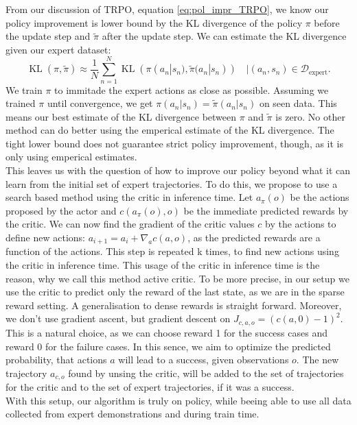 From our discussion of TRPO, equation \ref{eq:pol_impr_TRPO}, we know our policy improvement is lower bound by the KL divergence of the policy $\pi$ before the update step and 
$\tilde{\pi}$ after the update step. We can estimate the KL divergence given our expert dataset:
\begin{equation*}  
    {\operatorname{KL}} (\pi,\tilde{\pi}) \approx \frac{1}{N} \sum_{n=1}^N {\operatorname{KL}} (\pi(a_n|s_n),\tilde{\pi}(a_n|s_n)) \quad |(a_n,s_n) \in \mathcal{D}_{\text{expert}}.
\end{equation*}  
We train $\pi$ to immitade the expert actions as close as possible. Assuming we trained $\pi$ until convergence, we get $\pi(a_n|s_n) = \tilde{\pi}(a_n|s_n)$ on seen 
data. This means our best estimate of the KL divergence between $\pi$ and $\tilde{\pi}$ is zero. No other method can do better using the emperical 
estimate of the KL divergence. The tight lower bound does not guarantee strict policy improvement, though, as it is only using emperical estimates.
\\
This leaves us with the question of how to improve our policy beyond what it can learn from the initial set of expert trajectories. To do this, we propose to use 
a search based method using the critic in inference time. Let $a_{\pi}(o)$ be the actions proposed by the actor and $c(a_{\pi}(o), o)$ be the immediate predicted rewards by the critic. 
We can now find the gradient of the critic values $c$ by the actions to define new actions: $a_{i+1} = a_i + \nabla_{a}c(a, o)$, as the predicted rewards are a 
function of the actions. This step is repeated k times, to find new actions using the critic in inference time. This usage of the critic in inference time 
is the reason, why we call this method active critic. To be more precise, in our setup we use the critic to predict only the reward of the last state, as we are 
in the sparse reward setting. A generalisation to dense rewards is straight forward. Moreover, we don't use gradient ascent, but gradient descent on 
$J_{c, a, o} = (c(a, 0) - 1)^2$. This is a natural choice, as we can 
choose reward 1 for the success cases and reward 0 for the failure cases. In this sence, we aim to optimize the predicted probability, that actions $a$ will lead 
to a success, given observations $o$. The new trajectory $a_{c, o}$ found by unsing the critic, will 
be added to the set of trajectories for the critic and to the set of expert trajectories, if it was a success. \\
With this setup, our algorithm is truly on policy, while beeing able to use all data collected from expert demonstrations and during train time. 


